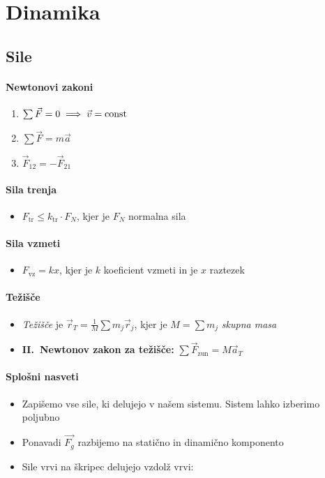\section{Dinamika}
\subsection{Sile}
\paragraph{Newtonovi zakoni}
\begin{enumerate}
    \item \(\sum \vec{F} = 0 \implies \vec{v} = \text{const}\)
    \item \(\sum \vec{F} = m \vec{a}\) 
    \item \(\vec{F}_{12} = -\vec{F}_{21}\) 
\end{enumerate}

\paragraph{Sila trenja}
\begin{itemize}
    \item \(F_\text{tr} \leq k_\text{tr} \cdot F_N\), kjer je \(F_N\) normalna sila
\end{itemize}

\paragraph{Sila vzmeti}
\begin{itemize}
    \item \(F_\text{vz} = kx\), kjer je \(k\) koeficient vzmeti in je \(x\) raztezek
\end{itemize}

\paragraph{Težišče}
\begin{itemize}
    \item \emph{Težišče} je \(\vec{r}_T = \frac{1}{M} \sum m_j \vec{r}_j\), kjer je \(M = \sum m_j\) \emph{skupna masa}
    \item \textbf{II.\ Newtonov zakon za težišče:} \(\sum \vec{F}_\text{zun} = M \vec{a}_T\)
\end{itemize}

\paragraph{Splošni nasveti}
\begin{itemize}
    \item Zapišemo vse sile, ki delujejo v našem sistemu. Sistem lahko izberimo poljubno
    \item Ponavadi \(\vec{F_g}\) razbijemo na statično in dinamično komponento
    \item Sile vrvi na škripec delujejo vzdolž vrvi:
\end{itemize}

